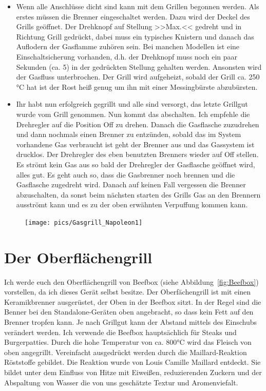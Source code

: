 \begin{itemize}[noitemsep]
	\item Wenn alle Anschlüsse dicht sind kann mit dem Grillen begonnen 
	werden. Als erstes müssen die Brenner 
	eingeschaltet werden. Dazu 
	wird der Deckel des Grills geöffnet. Der Drehknopf auf Stellung >>Max.<< 
	gedreht und in Richtung Grill gedrückt, dabei 
	muss ein typisches Knistern und danach das Auflodern der Gasflamme 
	zuhören sein. Bei manchen Modellen ist eine 
	Einschaltsicherung 
	vorhanden, d.h. der Drehknopf muss noch ein paar Sekunden (ca. 5) in der 
	gedrückten Stellung gehalten werden. 
	Ansonsten wird der Gasfluss unterbrochen. Der Grill wird aufgeheizt, sobald 
	der Grill ca. 250 °C hat ist der Rost heiß 
	genug um ihn mit einer 
	Messingbürste abzubürsten.
	\item Ihr habt nun erfolgreich gegrillt und alle sind versorgt, das letzte 
	Grillgut wurde vom Grill genommen. Nun kommt 
	das abschalten. Ich 
	empfehle die Drehregler auf die Position Off zu drehen. Danach die 
	Gasflasche zuzudrehen und dann nochmals einen 
	Brenner zu entzünden,
	sobald das im System vorhandene Gas verbraucht ist geht der Brenner aus 
	und das Gassystem ist drucklos. 
	Der Drehregler des eben benutzten Brenners wieder auf Off stellen. Es 
	strömt kein Gas aus so bald der Drehregler der 
	Gasflasche geöffnet wird, alles gut. 
	Es geht auch so, dass die Gasbrenner noch brennen und die Gasflasche 
	zugedreht wird. Danach auf keinen Fall vergessen 
	die Brenner abzuschalten, da sonst beim nächsten 
	starten des Grills Gas an den Brennern ausströmt kann und es zu der oben 
	erwähnten Verpuffung kommen kann.
\end{itemize}

\begin{figure}[htbp]
	\centering
	\begin{minipage}{1\textwidth}
		\centering
		\texttt{[image: pics/Gasgrill\_Napoleon1]}
		\label{fig:Napoleon}
	\end{minipage}
\end{figure}	
\newpage

\section{Der Oberflächengrill}
	
	Ich werde euch den Oberflächengrill von Beefbox (siehe Abbildung~\vref{fig:Beefbox}) vorstellen, da ich dieses 
	Gerät selbst besitze. Der Oberfächengrill ist mit 
	einen 
	Keramikbrenner ausgerüstet, der Oben in der Beefbox sitzt. In der Regel sind 
	die Benner bei den Standalone-Geräten oben 
	angebracht, so dass kein Fett auf den Brenner tropfen kann. Je nach Grillgut 
	kann der Abstand mittels des Einschubs 
	verändert werden. Ich 
	verwende die Beefbox hauptsächlich für Steaks  und Burgerpatties. Durch die 
	hohe Temperatur von ca. 800°C wird das 
	Fleisch von oben angegrillt. Vereinfacht ausgedrückt werden durch die 
	Maillard-Reaktion Röststoffe gebildet. Die Reaktion 
	wurde von Louis Camille 
	Maillard entdeckt. Sie bildet unter dem Einfluss von Hitze mit Eiweißen, 
	reduzierenden Zuckern und der Abspaltung 
	von Wasser die von uns geschätzte Textur und Aromenviefalt. 
	
